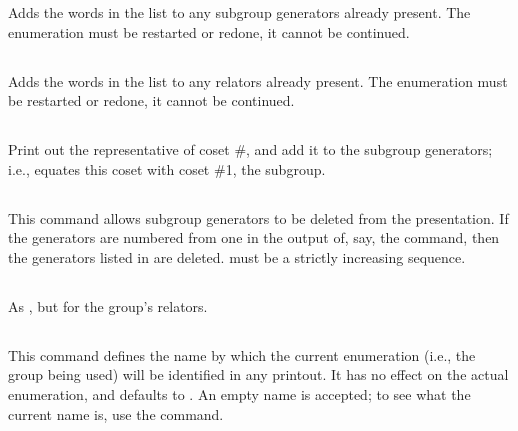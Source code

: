 Adds the words in the list to any subgroup generators already present.
The enumeration must be restarted or redone, it cannot be continued.

\subsection{}
\label{cmd:add relators}

Adds the words in the list to any relators already present.
The enumeration must be restarted or redone, it cannot be continued.

\subsection{}
\label{cmd:cc}
\label{cmd:coset coincidence}

Print out the representative of coset \#, and add it to the
  subgroup generators; i.e., equates this coset with coset \#1, the
  subgroup.

\subsection{}
\label{cmd:del generators}

This command allows subgroup generators to be deleted from the
  presentation.
If the generators are numbered from one in the output of, say, the
   command, then the generators listed in  are
  deleted.
 must be a strictly increasing sequence.

\subsection{}
\label{cmd:del relators}

As , but for the group's relators.

\subsection{}
\label{cmd:enumeration}

This command defines the name by which the current enumeration (i.e.,
  the group being used) will be identified in any printout.
It has no effect on the actual enumeration, and defaults to .
An empty name is accepted; to see what the current name is, use the
   command.

